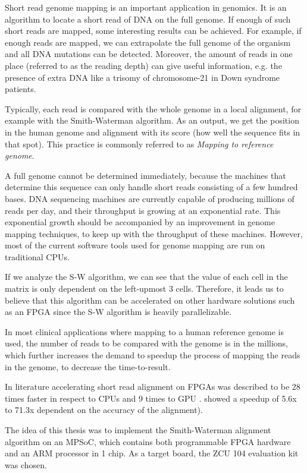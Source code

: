 Short read genome mapping is an important application in genomics. It is an algorithm to locate a short read of DNA on the full genome. If enough of such short reads are mapped, some interesting results can be achieved. For example, if enough reads are mapped, we can extrapolate the full genome of the organism and all DNA mutations can be detected. Moreover, the amount of reads in one place (referred to as the reading depth) can give useful information, e.g. the presence of extra DNA like a trisomy of chromosome-21 in Down syndrome patients.

Typically, each read is compared with the whole genome in a local alignment, for example with the Smith-Waterman algorithm. As an output, we get the position in the human genome and alignment with its score (how well the sequence fits in that spot). This practice is commonly referred to as \emph{Mapping to reference genome}.

A full genome cannot be determined immediately, because the machines that determine this sequence can only handle short reads consisting of a few hundred bases. DNA sequencing machines are currently capable of producing millions of reads per day, and their throughput is growing at an exponential rate. This exponential growth should be accompanied by an improvement in genome mapping techniques, to keep up with the throughput of these machines. However, most of the current software tools used for genome mapping are run on traditional CPUs. 

If we analyze the S-W algorithm, we can see that the value of each cell in the matrix is only dependent on the left-upmost 3 cells. Therefore, it leads us to believe that this algorithm can be accelerated on other hardware solutions such as an FPGA since the S-W algorithm is heavily parallelizable.

In most clinical applications where mapping to a human reference genome is used, the number of reads to be compared with the genome is in the millions, which further increases the demand to speedup the process of mapping the reads in the genome, to decrease the time-to-result.

In literature accelerating short read alignment on FPGAs was described to be 28 times faster in respect to CPUs and 9 times to GPU \cite{FPGAacc}. showed a speedup of 5.6x to 71.3x dependent on the accuracy of the alignment\cite{FPGAacc2}).

The idea of this thesis was to implement the Smith-Waterman alignment algorithm on an MPSoC, which contains both programmable FPGA hardware and an ARM processor in 1 chip. As a target board, the ZCU 104 evaluation kit was chosen.

